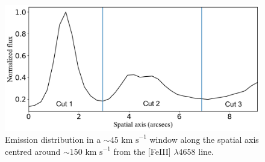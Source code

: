 \documentclass[fleqn,usenatbib]{mnras}
\begin{document}
\begin{figure}
\includegraphics[width=\columnwidth]{brillo_4658_HH514.pdf}
\caption{Emission distribution in a $\sim 45 \text{ km s}^{-1}$ window along the spatial axis centred around $\sim 150 \text{ km s}^{-1}$ from the [Fe\thinspace III] $\lambda 4658$ line.}
\label{fig:spatial_dis}
\end{figure}
\end{document}
